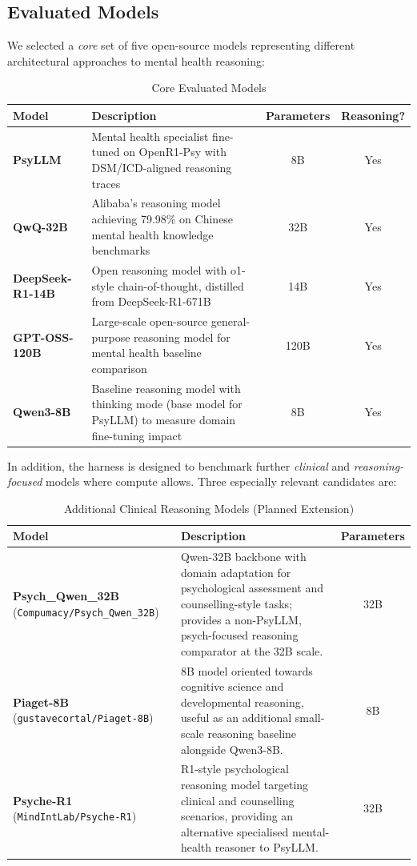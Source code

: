 \documentclass[11pt,a4paper]{article}
\begin{document}
\subsection{Evaluated Models}

We selected a \emph{core} set of five open-source models representing different architectural approaches to mental health reasoning:

\begin{table}[H]
\centering
\caption{Core Evaluated Models}
\begin{tabularx}{\textwidth}{@{}lXcc@{}}
\toprule
\textbf{Model} & \textbf{Description} & \textbf{Parameters} & \textbf{Reasoning?} \\
\midrule
\textbf{PsyLLM} & Mental health specialist fine-tuned on OpenR1-Psy with DSM/ICD-aligned reasoning traces & 8B & Yes \\
\addlinespace
\textbf{QwQ-32B} & Alibaba's reasoning model achieving 79.98\% on Chinese mental health knowledge benchmarks & 32B & Yes \\
\addlinespace
\textbf{DeepSeek-R1-14B} & Open reasoning model with o1-style chain-of-thought, distilled from DeepSeek-R1-671B & 14B & Yes \\
\addlinespace
\textbf{GPT-OSS-120B} & Large-scale open-source general-purpose reasoning model for mental health baseline comparison & 120B & Yes \\
\addlinespace
\textbf{Qwen3-8B} & Baseline reasoning model with thinking mode (base model for PsyLLM) to measure domain fine-tuning impact & 8B & Yes \\
\bottomrule
\end{tabularx}
\end{table}

In addition, the harness is designed to benchmark further \emph{clinical} and \emph{reasoning-focused} models where compute allows. Three especially relevant candidates are:

\begin{table}[H]
\centering
\caption{Additional Clinical Reasoning Models (Planned Extension)}
\begin{tabularx}{\textwidth}{@{}lXc@{}}
\toprule
\textbf{Model} & \textbf{Description} & \textbf{Parameters} \\
\midrule
\textbf{Psych\_Qwen\_32B} (\texttt{Compumacy/Psych\_Qwen\_32B}) & Qwen-32B backbone with domain adaptation for psychological assessment and counselling-style tasks; provides a non-PsyLLM, psych-focused reasoning comparator at the 32B scale. & 32B \\
\addlinespace
\textbf{Piaget-8B} (\texttt{gustavecortal/Piaget-8B}) & 8B model oriented towards cognitive science and developmental reasoning, useful as an additional small-scale reasoning baseline alongside Qwen3-8B. & 8B \\
\addlinespace
\textbf{Psyche-R1} (\texttt{MindIntLab/Psyche-R1}) & R1-style psychological reasoning model targeting clinical and counselling scenarios, providing an alternative specialised mental-health reasoner to PsyLLM. & 32B \\
\bottomrule
\end{tabularx}
\end{table}
\end{document}
